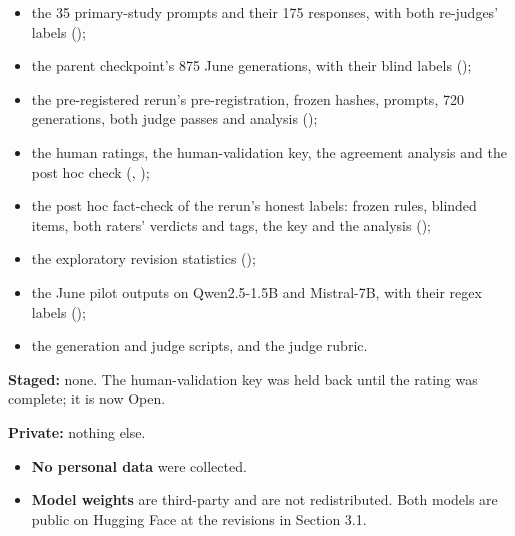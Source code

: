 \documentclass[11pt,letterpaper]{article}
\providecommand{\tightlist}{\setlength{\itemsep}{0pt}\setlength{\parskip}{0pt}}
\DeclareRobustCommand{\_}{\textunderscore\allowbreak}
\begin{document}
\begin{itemize}
\tightlist
\item
  the 35 primary-study prompts and their 175 responses, with both re-judges' labels ();
\item
  the parent checkpoint's 875 June generations, with their blind labels ();
\item
  the pre-registered rerun's pre-registration, frozen hashes, prompts, 720 generations, both judge passes and analysis ();
\item
  the human ratings, the human-validation key, the agreement analysis and the post hoc check (, );
\item
  the post hoc fact-check of the rerun's honest labels: frozen rules, blinded items, both raters' verdicts and tags, the key and the analysis ();
\item
  the exploratory revision statistics ();
\item
  the June pilot outputs on Qwen2.5-1.5B and Mistral-7B, with their regex labels ();
\item
  the generation and judge scripts, and the judge rubric.
\end{itemize}

\textbf{Staged:} none. The human-validation key was held back until the rating was complete; it is now Open.

\textbf{Private:} nothing else.

\begin{itemize}
\tightlist
\item
  \textbf{No personal data} were collected.
\item
  \textbf{Model weights} are third-party and are not redistributed. Both models are public on Hugging Face at the revisions in Section 3.1.
\end{itemize}




\end{document}
